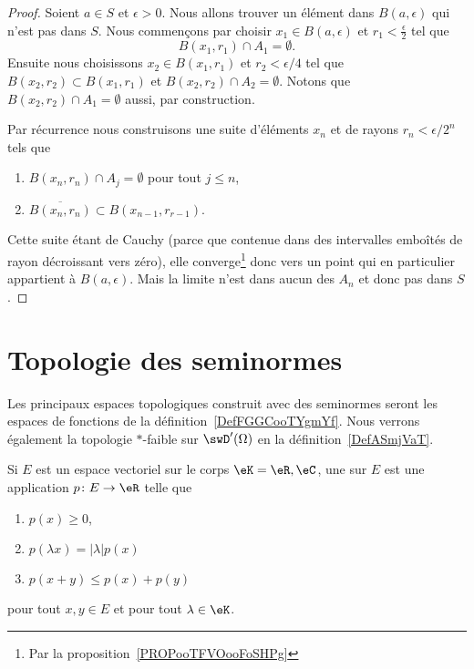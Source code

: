 \begin{proof}
    Soient \( a\in S\) et \( \epsilon>0\). Nous allons trouver un élément dans \( B(a,\epsilon)\) qui n'est pas dans \( S\). Nous commençons par choisir \( x_1\in B(a,\epsilon)\) et \( r_1<\frac{ \epsilon }{2}\) tel que
    \begin{equation}
        B(x_1,r_1)\cap A_1=\emptyset.
    \end{equation}
    Ensuite nous choisissons \( x_2\in B(x_1,r_1)\) et \( r_2<\epsilon/4\) tel que \( B(x_2,r_2)\subset B(x_1,r_1)\) et \( B(x_2,r_2)\cap A_2=\emptyset\). Notons que \( B(x_2,r_2)\cap A_1=\emptyset\) aussi, par construction.

    Par récurrence nous construisons une suite d'éléments \( x_n\) et de rayons \( r_n<\epsilon/2^n\) tels que
    \begin{enumerate}
        \item
            \( B(x_n,r_n)\cap A_j=\emptyset\) pour tout \( j\leq n\),
        \item
            \( \overline{ B(x_n,r_n) }\subset B(x_{n-1},r_{r-1})\).
    \end{enumerate}
    Cette suite étant de Cauchy (parce que contenue dans des intervalles emboîtés de rayon décroissant vers zéro), elle converge\footnote{Par la proposition~\ref{PROPooTFVOooFoSHPg}} donc vers un point qui en particulier appartient à \( B(a,\epsilon)\). Mais la limite n'est dans aucun des \( A_n\) et donc pas dans \( S\).
\end{proof}

\section{Topologie des seminormes}

Les principaux espaces topologiques construit avec des seminormes seront les espaces de fonctions de la définition~\ref{DefFGGCooTYgmYf}. Nous verrons également la topologie \( *\)-faible sur \( \swD'(\Omega)\) en la définition~\ref{DefASmjVaT}.

\begin{definition}  \label{DefPNXlwmi}
    Si \( E\) est un espace vectoriel sur le corps \( \eK=\eR,\eC\), une  sur \( E\) est une application \( p\colon E\to \eR\) telle que
    \begin{enumerate}
        \item
            \( p(x)\geq 0\),
        \item   \label{ItemSHnimhDii}
            \( p(\lambda x)=| \lambda |p(x)\)
        \item   \label{ItemSHnimhDiii}
            \( p(x+y)\leq p(x)+p(y)\)
    \end{enumerate}
    pour tout \( x,y\in E\) et pour tout \( \lambda\in \eK\).
\end{definition}

